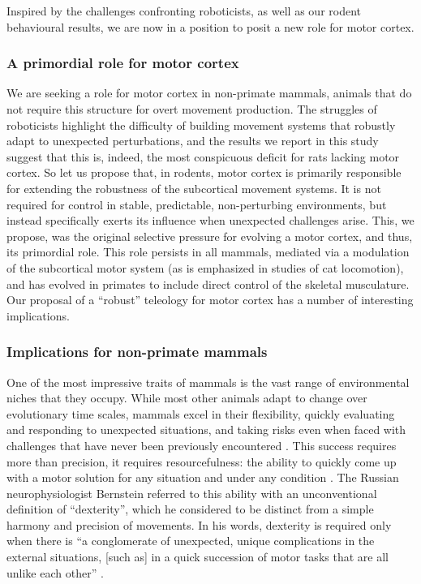 Inspired by the challenges confronting roboticists, as well as our rodent behavioural results, we are now in a position to posit a new role for motor cortex.

\subsubsection*{A primordial role for motor cortex}

We are seeking a role for motor cortex in non-primate mammals, animals that do not require this structure for overt movement production. The struggles of roboticists highlight the difficulty of building movement systems that robustly adapt to unexpected perturbations, and the results we report in this study suggest that this is, indeed, the most conspicuous deficit for rats lacking motor cortex. So let us propose that, in rodents, motor cortex is primarily responsible for extending the robustness of the subcortical movement systems. It is not required for control in stable, predictable, non-perturbing environments, but instead specifically exerts its influence when unexpected challenges arise. This, we propose, was the original selective pressure for evolving a motor cortex, and thus, its primordial role. This role persists in all mammals, mediated via a modulation of the subcortical motor system (as is emphasized in studies of cat locomotion), and has evolved in primates to include direct control of the skeletal musculature. Our proposal of a ``robust'' teleology for motor cortex has a number of interesting implications.

\subsubsection*{Implications for non-primate mammals}

One of the most impressive traits of mammals is the vast range of environmental niches that they occupy. While most other animals adapt to change over evolutionary time scales, mammals excel in their flexibility, quickly evaluating and responding to unexpected situations, and taking risks even when faced with challenges that have never been previously encountered \cite{Spinka2001}. This success requires more than precision, it requires resourcefulness: the ability to quickly come up with a motor solution for any situation and under any condition \cite{Bernstein1996}. The Russian neurophysiologist Bernstein referred to this ability with an unconventional definition of ``dexterity'', which he considered to be distinct from a simple harmony and precision of movements. In his words, dexterity is required only when there is \enquote{a conglomerate of unexpected, unique complications in the external situations, [such as] in a quick succession of motor tasks that are all unlike each other} \cite{Bernstein1996}.

